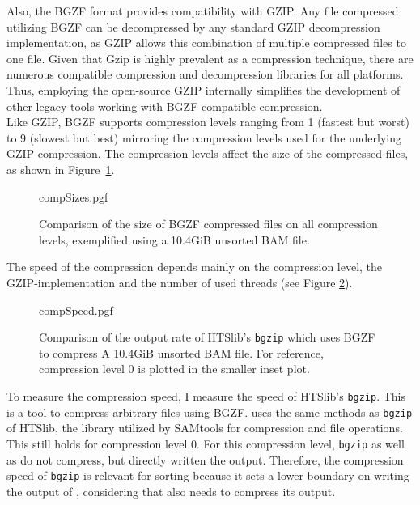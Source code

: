 Also, the BGZF format provides compatibility with GZIP. Any file compressed utilizing BGZF can be decompressed by any standard GZIP decompression implementation, as GZIP allows this combination of multiple compressed files to one file. Given that Gzip is highly prevalent as a compression technique, there are numerous compatible compression and decompression libraries for all platforms. Thus, employing the open-source GZIP internally simplifies the development of other legacy tools working with BGZF-compatible compression.  \\

Like GZIP, BGZF supports compression levels ranging from 1 (fastest but worst) to 9 (slowest but best) mirroring the compression levels used for the underlying GZIP compression. The compression levels affect the size of the compressed files, as shown in Figure~\ref{fig:compSizes}.
\begin{figure}
        {compSizes.pgf}
    \caption{Comparison of the size of BGZF compressed files on all compression levels, exemplified using a 10.4GiB unsorted BAM file.}
    \label{fig:compSizes}
\end{figure}
The speed of the compression depends mainly on the compression level, the GZIP-implementation and the number of used threads (see Figure \ref{fig:compSpeed}).  
\begin{figure}
        {compSpeed.pgf}
    \caption{Comparison of the output rate of HTSlib's \texttt{bgzip} which uses BGZF to compress A 10.4GiB unsorted BAM file. For reference, compression level 0 is plotted in the smaller inset plot.}
    \label{fig:compSpeed}
\end{figure}
To measure the compression speed, I measure the speed of HTSlib's \texttt{bgzip}. This is a tool to compress arbitrary files using BGZF. \sort uses the same methods as \texttt{bgzip} of HTSlib, the library utilized by SAMtools for compression and file operations. This still holds for compression level 0. For this compression level, \texttt{bgzip} as well as \sort do not compress, but directly written the output. Therefore, the compression speed of \texttt{bgzip} is relevant for sorting because it sets a lower boundary on writing the output of \sort, considering that \sort also needs to compress its output.
